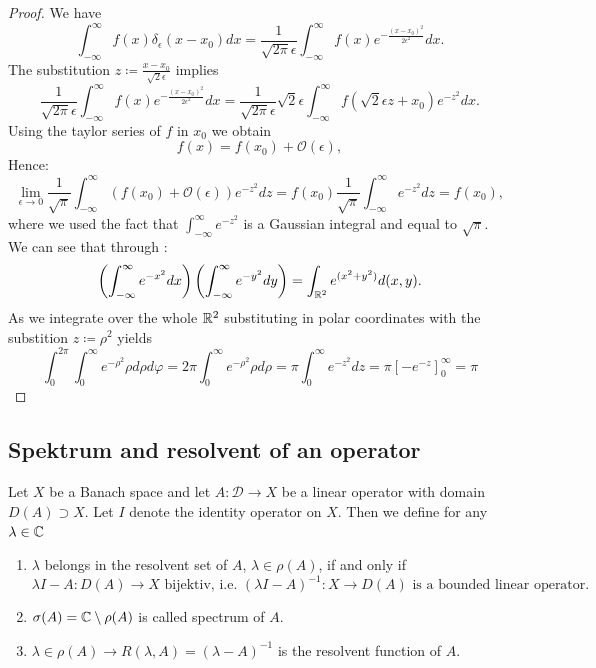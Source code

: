 \begin{proof}
	We have
	\[ \int_{-\infty}^{\infty} f(x) \delta_{\epsilon}(x-x_{0}) dx = \frac{1}{\sqrt{2\pi} \epsilon} \int_{-\infty}^{\infty} f(x) e^{-\frac{(x - x_{0})^{2}}{2 \epsilon^{2}}} dx. \] 
	The substitution $z \coloneqq \frac{x - x_{0}}{\sqrt{2} \epsilon}$ implies 
	\[ \frac{1}{\sqrt{2\pi} \epsilon} \int_{-\infty}^{\infty} f(x) e^{-\frac{(x - x_{0})^{2}}{2 \epsilon^{2}}} dx = \frac{1}{\sqrt{2\pi} \epsilon} \sqrt{2} \epsilon \int_{-\infty}^{\infty} f(\sqrt{2} \epsilon z + x_{0}) e^{-z^{2}} dx. \]
	Using the taylor series of $f$ in $x_{0}$ we obtain
	\[ f(x) = f(x_{0}) + \mathcal{O}(\epsilon), \]
	Hence:
	\[ \lim_{\epsilon \rightarrow 0} \frac{1}{\sqrt{\pi}} \int_{-\infty}^{\infty} (f(x_{0}) + \mathcal{O}(\epsilon)) e^{-z^{2}} dz = f(x_{0}) \frac{1}{\sqrt{\pi}} \int_{-\infty}^{\infty} e^{-z^{2}} dz = f(x_{0}), \]
	where we used the fact that $\int_{-\infty}^{\infty} e^{-z^{2}}$ is a Gaussian integral and equal to $\sqrt{\pi}$. We can see that through :
	\[ \left( \int_{-\infty}^{\infty} e^{-x^{2}} dx \right) \left( \int_{-\infty}^{\infty} e^{-y^{2}} dy \right) = \int_{\mathbb{R}^{2}} e^{(x^{2} + y^{2})} d(x, y). \] 
	As we integrate over the whole $\mathbb{R}^{2}$ substituting in polar coordinates with the substition $z \coloneqq \rho^{2}$ yields
	\[ \int_{0}^{2 \pi} \int_{0}^{\infty} e^{-\rho^{2}} \rho d\rho d\varphi = 2 \pi \int_{0}^{\infty} e^{-\rho^{2}} \rho d\rho = \pi \int_{0}^{\infty} e^{-z^{2}} dz = \pi \left[ -e^{-z} \right]_{0}^{\infty} = \pi \]
\end{proof} 


\subsection*{Spektrum and resolvent of an operator}

Let $X$ be a Banach space and let $A \colon \mathcal{D} \rightarrow X$ be a  linear operator with domain $D(A) \supset X$. Let $I$ denote the identity operator on $X$. Then we define for any $\lambda \in \mathbb{C}$
	\begin{enumerate}[label=\alph*\upshape)]
		\item $\lambda$ belongs in the resolvent set of $A$, $\lambda \in \rho(A)$, if and only if
			\[ \lambda I - A \colon D(A) \rightarrow X \text{ bijektiv, i.e. } (\lambda I - A)^{-1} \colon X \rightarrow D(A) \text{ is a bounded linear operator.} \]
		\item $\sigma(A) = \mathbb{C} \setminus \rho(A)$ is called spectrum of $A$.
		\item $\lambda \in \rho(A) \rightarrow R(\lambda, A) = (\lambda - A)^{-1}$ is the resolvent function of $A$.
	\end{enumerate}	
	
